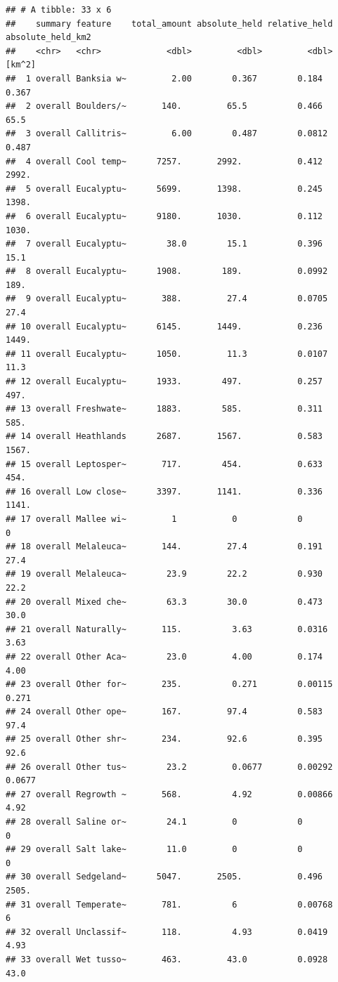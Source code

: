 \documentclass[
  12pt,
]{book}
\begin{document}
\begin{verbatim}
## # A tibble: 33 x 6
##    summary feature    total_amount absolute_held relative_held absolute_held_km2
##    <chr>   <chr>             <dbl>         <dbl>         <dbl>            [km^2]
##  1 overall Banksia w~         2.00        0.367        0.184              0.367 
##  2 overall Boulders/~       140.         65.5          0.466             65.5   
##  3 overall Callitris~         6.00        0.487        0.0812             0.487 
##  4 overall Cool temp~      7257.       2992.           0.412           2992.    
##  5 overall Eucalyptu~      5699.       1398.           0.245           1398.    
##  6 overall Eucalyptu~      9180.       1030.           0.112           1030.    
##  7 overall Eucalyptu~        38.0        15.1          0.396             15.1   
##  8 overall Eucalyptu~      1908.        189.           0.0992           189.    
##  9 overall Eucalyptu~       388.         27.4          0.0705            27.4   
## 10 overall Eucalyptu~      6145.       1449.           0.236           1449.    
## 11 overall Eucalyptu~      1050.         11.3          0.0107            11.3   
## 12 overall Eucalyptu~      1933.        497.           0.257            497.    
## 13 overall Freshwate~      1883.        585.           0.311            585.    
## 14 overall Heathlands      2687.       1567.           0.583           1567.    
## 15 overall Leptosper~       717.        454.           0.633            454.    
## 16 overall Low close~      3397.       1141.           0.336           1141.    
## 17 overall Mallee wi~         1           0            0                  0     
## 18 overall Melaleuca~       144.         27.4          0.191             27.4   
## 19 overall Melaleuca~        23.9        22.2          0.930             22.2   
## 20 overall Mixed che~        63.3        30.0          0.473             30.0   
## 21 overall Naturally~       115.          3.63         0.0316             3.63  
## 22 overall Other Aca~        23.0         4.00         0.174              4.00  
## 23 overall Other for~       235.          0.271        0.00115            0.271 
## 24 overall Other ope~       167.         97.4          0.583             97.4   
## 25 overall Other shr~       234.         92.6          0.395             92.6   
## 26 overall Other tus~        23.2         0.0677       0.00292            0.0677
## 27 overall Regrowth ~       568.          4.92         0.00866            4.92  
## 28 overall Saline or~        24.1         0            0                  0     
## 29 overall Salt lake~        11.0         0            0                  0     
## 30 overall Sedgeland~      5047.       2505.           0.496           2505.    
## 31 overall Temperate~       781.          6            0.00768            6     
## 32 overall Unclassif~       118.          4.93         0.0419             4.93  
## 33 overall Wet tusso~       463.         43.0          0.0928            43.0
\end{verbatim}
\end{document}
